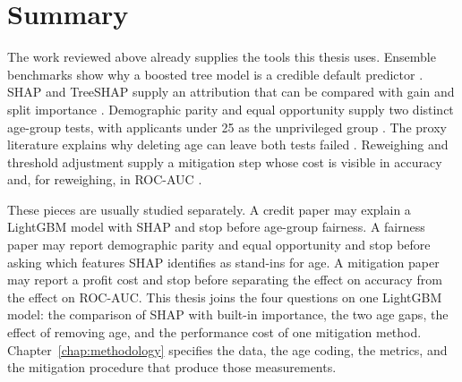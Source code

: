 \section{Summary}
\label{sec:related-summary}

The work reviewed above already supplies the tools this thesis uses. Ensemble benchmarks show why a boosted tree model is a credible default predictor \citep{lessmann2015benchmark, ke2017lightgbm, delange2022xai}. SHAP and TreeSHAP supply an attribution that can be compared with gain and split importance \citep{lundberg2017shap, lundberg2020treeshap}. Demographic parity and equal opportunity supply two distinct age-group tests, with applicants under 25 as the unprivileged group \citep{hardt2016equality, kamiran2012reweighing, bellamy2019aif360}. The proxy literature explains why deleting age can leave both tests failed \citep{pedreschi2008discrimination, kilbertus2017proxy}. Reweighing and threshold adjustment supply a mitigation step whose cost is visible in accuracy and, for reweighing, in ROC-AUC \citep{kamiran2012reweighing, kozodoi2022fairness}.

These pieces are usually studied separately. A credit paper may explain a LightGBM model with SHAP and stop before age-group fairness. A fairness paper may report demographic parity and equal opportunity and stop before asking which features SHAP identifies as stand-ins for age. A mitigation paper may report a profit cost and stop before separating the effect on accuracy from the effect on ROC-AUC. This thesis joins the four questions on one LightGBM model: the comparison of SHAP with built-in importance, the two age gaps, the effect of removing age, and the performance cost of one mitigation method. Chapter~\ref{chap:methodology} specifies the data, the age coding, the metrics, and the mitigation procedure that produce those measurements.